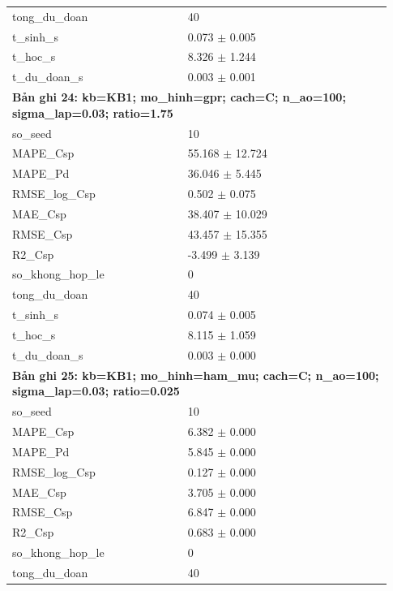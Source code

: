 \begin{longtable}{p{0.43\linewidth}p{0.50\linewidth}}
tong\_\allowbreak du\_\allowbreak doan & 40 \\
t\_\allowbreak sinh\_\allowbreak s & 0.073 $\pm$ 0.005 \\
t\_\allowbreak hoc\_\allowbreak s & 8.326 $\pm$ 1.244 \\
t\_\allowbreak du\_\allowbreak doan\_\allowbreak s & 0.003 $\pm$ 0.001 \\
\midrule
\multicolumn{2}{p{0.95\linewidth}}{\textbf{Bản ghi 24: kb=KB1; mo\_hinh=gpr; cach=C; n\_ao=100; sigma\_lap=0.03; ratio=1.75}} \\
so\_\allowbreak seed & 10 \\
MAPE\_\allowbreak Csp & 55.168 $\pm$ 12.724 \\
MAPE\_\allowbreak Pd & 36.046 $\pm$ 5.445 \\
RMSE\_\allowbreak log\_\allowbreak Csp & 0.502 $\pm$ 0.075 \\
MAE\_\allowbreak Csp & 38.407 $\pm$ 10.029 \\
RMSE\_\allowbreak Csp & 43.457 $\pm$ 15.355 \\
R2\_\allowbreak Csp & -3.499 $\pm$ 3.139 \\
so\_\allowbreak khong\_\allowbreak hop\_\allowbreak le & 0 \\
tong\_\allowbreak du\_\allowbreak doan & 40 \\
t\_\allowbreak sinh\_\allowbreak s & 0.074 $\pm$ 0.005 \\
t\_\allowbreak hoc\_\allowbreak s & 8.115 $\pm$ 1.059 \\
t\_\allowbreak du\_\allowbreak doan\_\allowbreak s & 0.003 $\pm$ 0.000 \\
\midrule
\multicolumn{2}{p{0.95\linewidth}}{\textbf{Bản ghi 25: kb=KB1; mo\_hinh=ham\_mu; cach=C; n\_ao=100; sigma\_lap=0.03; ratio=0.025}} \\
so\_\allowbreak seed & 10 \\
MAPE\_\allowbreak Csp & 6.382 $\pm$ 0.000 \\
MAPE\_\allowbreak Pd & 5.845 $\pm$ 0.000 \\
RMSE\_\allowbreak log\_\allowbreak Csp & 0.127 $\pm$ 0.000 \\
MAE\_\allowbreak Csp & 3.705 $\pm$ 0.000 \\
RMSE\_\allowbreak Csp & 6.847 $\pm$ 0.000 \\
R2\_\allowbreak Csp & 0.683 $\pm$ 0.000 \\
so\_\allowbreak khong\_\allowbreak hop\_\allowbreak le & 0 \\
tong\_\allowbreak du\_\allowbreak doan & 40 \\

\end{longtable}
